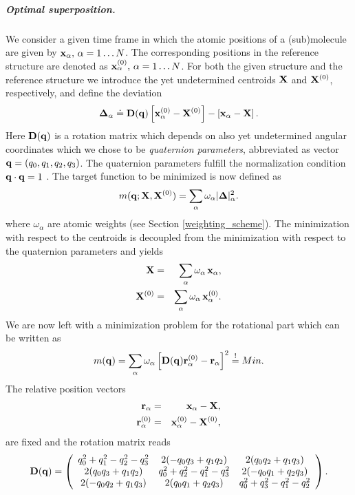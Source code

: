 \documentclass[a4paper,11pt]{report}
\begin{document}
\subparagraph{Optimal superposition.} We consider a given time frame in which the atomic positions of a (sub)molecule are 
given by  ${\bf x}_\alpha,\,\alpha = 1\ldots N$. The corresponding positions in the reference structure are denoted as 
${\bf x}^{(0)}_\alpha,\,\alpha = 1\ldots N$. For both the given structure and the reference structure we introduce the yet 
undetermined centroids ${\bf X}$ and  ${\bf X}^{(0)}$, respectively, and define the deviation 
\begin{equation}
\label{eq:delta}
{\bf \Delta}_\alpha \doteq
{\bf D}({\bf q})\left[{\bf x}^{(0)}_\alpha - {\bf X}^{(0)}\right] -   
       \left[{\bf x}_\alpha - {\bf X}\right].   
\end{equation} 
Here ${\bf D}({\bf q})$ is a rotation matrix which depends on also yet undetermined angular coordinates which we chose to 
be {\em quaternion parameters}, abbreviated as vector ${\bf q} = (q_0,q_1,q_2,q_3)$. The quaternion parameters fulfill the 
normalization condition ${\bf q}\cdot{\bf q} = 1$ \cite{Altmann}. The target function to be minimized is now defined as
\begin{equation}
m({\bf q};{\bf X},{\bf X}^{(0)}) = 
\sum_\alpha \omega_\alpha |{\bf\Delta}|^2_\alpha.
\end{equation}
where $\omega_\alpha$ are atomic weights (see Section \ref{weighting_scheme}). The minimization with respect to the centroids 
is decoupled from the minimization with respect to the quaternion parameters and yields
\begin{eqnarray}
{\bf X}       &= &\sum_\alpha \omega_\alpha\,{\bf x}_\alpha,\\
{\bf X}^{(0)} &= &\sum_\alpha \omega_\alpha\,{\bf x}^{(0)}_\alpha.
\end{eqnarray} 
We are now left with a minimization problem for the rotational part which can be written as
\begin{equation}
\label{eq:minimize_rot}
m({\bf q}) = \sum_\alpha \omega_\alpha 
\left[{\bf D}({\bf q}){\bf r}^{(0)}_\alpha - {\bf r}_\alpha\right]^2
\stackrel{!}{=} Min.
\end{equation}
The relative position vectors
\begin{eqnarray}
{\bf r}_\alpha        &= &{\bf x}_\alpha - {\bf X},\\
{\bf r}^{(0)}_\alpha  &= &{\bf x}^{(0)}_\alpha - {\bf X}^{(0)},
\end{eqnarray} 
are fixed and the rotation matrix reads \cite{Altmann}
\begin{equation}
\label{eq:d_quat}
{\bf D}({\bf q}) = 
\left(
\begin{array}{ccc}
 q_0^2+q_1^2-q^2_2-q^2_3  &2(-q_0q_3+q_1q_2) &2(q_0q_2+q_1q_3) \\
 2(q_0q_3+q_1q_2)  &q_0^2+q_2^2-q^2_1-q^2_3  &2(-q_0q_1+q_2q_3)\\
 2(-q_0q_2+q_1q_3) &2(q_0q_1+q_2q_3)  &q_0^2+q_3^2-q^2_1-q^2_2  
\end{array}
\right).
\end{equation}
\end{document}
